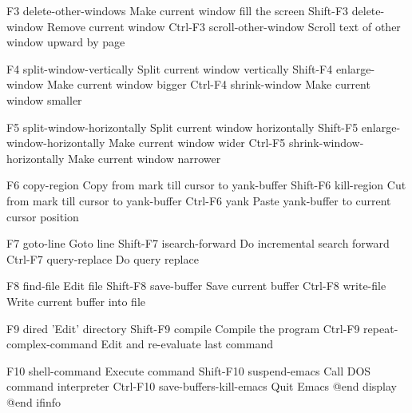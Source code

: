 F3         delete-other-windows Make current window fill the screen
Shift-F3   delete-window        Remove current window
Ctrl-F3    scroll-other-window  Scroll text of other window upward by page

F4         split-window-vertically      Split current window vertically
Shift-F4   enlarge-window               Make current window bigger
Ctrl-F4    shrink-window                Make current window smaller

F5         split-window-horizontally    Split current window horizontally
Shift-F5   enlarge-window-horizontally  Make current window wider
Ctrl-F5    shrink-window-horizontally   Make current window narrower

F6         copy-region          Copy from mark till cursor to yank-buffer
Shift-F6   kill-region          Cut from mark till cursor to yank-buffer
Ctrl-F6    yank                 Paste yank-buffer to current cursor position

F7         goto-line            Goto line
Shift-F7   isearch-forward      Do incremental search forward
Ctrl-F7    query-replace        Do query replace

F8         find-file            Edit file
Shift-F8   save-buffer          Save current buffer
Ctrl-F8    write-file           Write current buffer into file

F9         dired                        'Edit' directory
Shift-F9   compile                      Compile the program
Ctrl-F9    repeat-complex-command       Edit and re-evaluate last command

F10        shell-command                Execute command
Shift-F10  suspend-emacs                Call DOS command interpreter
Ctrl-F10   save-buffers-kill-emacs      Quit Emacs
@end display
@end ifinfo

